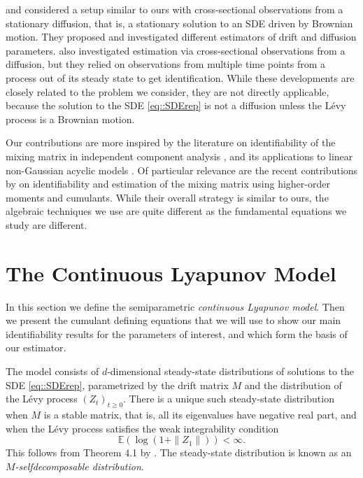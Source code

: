 \documentclass{biometrika}
\begin{document}
\cite{Lorch:2024} and \cite{bleile_efficient_2026} considered a setup similar to ours 
with cross-sectional observations from a stationary diffusion, that is, a 
stationary solution to an SDE driven by Brownian motion. They proposed 
and investigated different estimators of drift and diffusion parameters.
\cite{guan2024identifyingdriftdiffusioncausal} also investigated estimation
via cross-sectional observations from a diffusion, but they relied on
observations from multiple time points from a process out of its steady state 
to get identification. 
While these developments are closely related to the problem we consider, 
they are not directly applicable, because the solution to the SDE \eqref{eq::SDErep} is not a diffusion unless the Lévy process is a Brownian motion.

Our contributions are more inspired by the literature on 
identifiability of the mixing matrix in independent 
component analysis \citep{COMON1994287}, and its applications to linear non-Gaussian acyclic models \citep{JMLRv7shimizu06a}. Of particular relevance are the recent contributions by \cite{Zwiernik2024nonindependentcomponentsanalysis}
on identifiability and estimation of the mixing matrix using 
higher-order moments and cumulants. While their overall strategy is similar to ours, 
the algebraic techniques we use are quite different as the fundamental 
equations we study are different.


\section{The Continuous Lyapunov Model}

In this section we define the semiparametric \emph{continuous Lyapunov model}. Then we present the cumulant defining equations that we will use to show our main identifiability results for the parameters of interest, and which form the basis of our estimator.


The model consists of $d$-dimensional steady-state distributions of solutions to the SDE \eqref{eq::SDErep}, parametrized by the drift matrix $M$ and the distribution of the Lévy process $(Z_t)_{t \geq 0}$. There is a unique such steady-state distribution when $M$ is a stable matrix, 
that is, all its eigenvalues have negative real part, and when the Lévy process satisfies the 
weak integrability condition
\begin{equation}
    \label{eq:levy-int-cond}
    \mathbb{E}(\log(1 + \|Z_1\|)) < \infty.    
\end{equation}
This follows from Theorem 4.1 by \cite{Sato:1984}. The steady-state distribution is known as 
an \emph{$M$-selfdecomposable distribution}.
\end{document}
